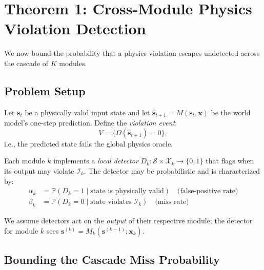 \documentclass[11pt,twocolumn]{article}
\theoremstyle{definition}
\newcommand{\Pbb}{\mathbb{P}}
\newcommand{\cS}{\mathcal{S}}
\newcommand{\cX}{\mathcal{X}}
\begin{document}
\section{Theorem 1: Cross-Module Physics Violation Detection}
\label{sec:thm1}

We now bound the probability that a physics violation escapes undetected
across the cascade of $K$ modules.

\subsection{Problem Setup}

Let $\mathbf{s}_t$ be a physically valid input state and let
$\hat{\mathbf{s}}_{t+1} = M(\mathbf{s}_t, \mathbf{x})$ be the world model's
one-step prediction.  Define the \emph{violation event}:
\begin{equation}
  V = \bigl\{ \Omega(\hat{\mathbf{s}}_{t+1}) = 0 \bigr\},
\end{equation}
i.e., the predicted state fails the global physics oracle.

Each module $k$ implements a \emph{local detector} $D_k: \cS \times \cX_k \to
\{0,1\}$ that flags when its output may violate $\mathcal{I}_k$.  The
detector may be probabilistic and is characterized by:
\begin{align}
  \alpha_k &= \Pbb(D_k = 1 \mid \text{state is physically valid})
            \quad\text{(false-positive rate)} \label{eq:alpha} \\
  \beta_k  &= \Pbb(D_k = 0 \mid \text{state violates } \mathcal{I}_k)
            \quad\text{(miss rate)} \label{eq:beta}
\end{align}

We assume detectors act on the \emph{output} of their respective module; the
detector for module $k$ sees $\mathbf{s}^{(k)} = M_k(\mathbf{s}^{(k-1)};
\mathbf{x}_k)$.

\subsection{Bounding the Cascade Miss Probability}
\end{document}

